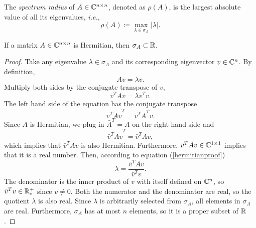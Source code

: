 \begin{definition}
The \emph{spectrum radius} of \(A\in\mathbb{C}^{n\times n}\), denoted as \(\rho(A)\), is the largest absolute value of all its eigenvalues, \textit{i.e.},
\begin{equation*}
\rho(A)\coloneqq\max_{\lambda\in\sigma_A}|\lambda|.
\end{equation*}
\end{definition}


\begin{theorem}
If a matrix \(A\in\mathbb{C}^{n\times n}\) is Hermitian, then \(\sigma_A\subset\mathbb{R}\).
\end{theorem}
\begin{proof}
Take any eigenvalue \(\lambda\in\sigma_A\) and its corresponding eigenvector \(v\in\mathbb{C}^n\).
By definition,
\begin{equation*}
Av=\lambda v.
\end{equation*}
Multiply both sides by the conjugate transpose of $v$,
\begin{equation}\label{hermitianproof}
\bar{v}^T Av=\lambda \bar{v}^T v.
\end{equation}
The left hand side of the equation has the conjugate transpose
\begin{equation*}
\overline{\bar{v}^T Av}^T=\bar{v}^T\bar{A}^T v.
\end{equation*}
Since $A$ is Hermitian, we plug in \(\bar{A}^T=A\) on the right hand side and
\begin{equation*}
\overline{\bar{v}^T Av}^T=\bar{v}^TA v,
\end{equation*}
which implies that \(\bar{v}^T Av\) is also Hermitian.
Furthermore, \(\bar{v}^T Av\in\mathbb{C}^{1\times1}\) implies that it is a real number.
Then, according to equation (\ref{hermitianproof})
\begin{equation*}
\lambda=\frac{\bar{v}^T Av}{\bar{v}^T v}.
\end{equation*}
The denominator is the inner product of $v$ with itself defined on \(\mathbb{C}^n\), so \(\bar{v}^T v\in\mathbb{R}_*^+\) since \(v\neq0\).
Both the numerator and the denominator are real, so the quotient $\lambda$ is also real.
Since $\lambda$ is arbitrarily selected from \(\sigma_A\), all elements in \(\sigma_A\) are real.
Furthermore, \(\sigma_A\) has at most $n$ elements, so it is a proper subset of \(\mathbb{R}\).
\end{proof}

